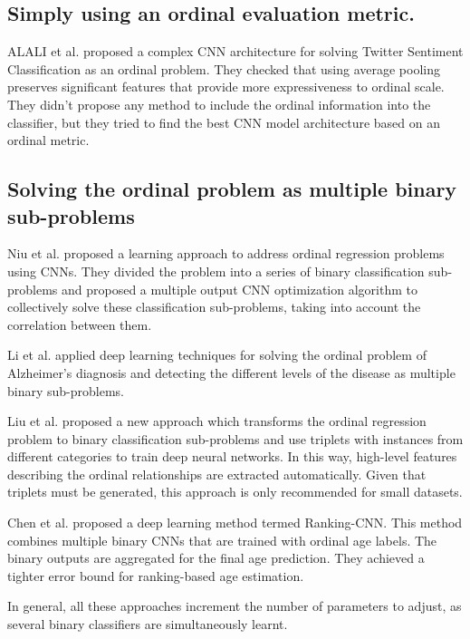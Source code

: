 \documentclass[preprint]{elsarticle}
\begin{document}
\subsection{Simply using an ordinal evaluation metric.}

ALALI et al. \cite{alali2018multi} proposed a complex CNN architecture for solving Twitter Sentiment Classification as an ordinal problem. They checked that using average pooling preserves significant features that provide more expressiveness to ordinal scale. They didn't propose any method to include the ordinal information into the classifier, but they tried to find the best CNN model architecture based on an ordinal metric.

\subsection{Solving the ordinal problem as multiple binary sub-problems}

Niu et al. \cite{niu2016ordinal} proposed a learning approach to address ordinal regression problems using CNNs. They divided the problem into a series of binary classification sub-problems and proposed a multiple output CNN optimization algorithm to collectively solve these classification sub-problems, taking into account the correlation between them.

Li et al. \cite{li2017deep} applied deep learning techniques for solving the ordinal problem of Alzheimer's diagnosis and detecting the different levels of the disease as multiple binary sub-problems.

Liu et al. \cite{liu2017deep} proposed a new approach which transforms the ordinal regression problem to binary classification sub-problems and use triplets with instances from different categories to train deep neural networks. In this way, high-level features describing the ordinal relationships are extracted automatically. Given that triplets must be generated, this approach is only recommended for small datasets.

Chen et al. \cite{chen2017using} proposed a deep learning method termed Ranking-CNN. This method combines multiple binary CNNs that are trained with ordinal age labels. The binary outputs are aggregated for the final age prediction. They achieved a tighter error bound for ranking-based age estimation.

In general, all these approaches increment the number of parameters to adjust, as several binary classifiers are simultaneously learnt.
\end{document}
